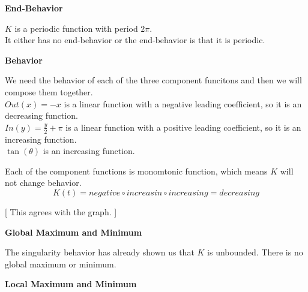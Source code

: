 \documentclass{ximera}
\begin{document}
\textbf{\textcolor{blue!55!black}{End-Behavior}}


$K$ is a periodic function with period $2\pi$. \\

It either has no end-behavior or the end-behavior is that it is periodic.











\textbf{\textcolor{blue!55!black}{Behavior}}


We need the behavior of each of the three component funcitons and then we will compose them together. \\




$Out(x) = -x$ is a linear function with a negative leading coefficient, so it is an decreasing function.\\


$In(y) = \frac{y}{2} + \pi$ is a linear function with a positive leading coefficient, so it is an increasing function.\\


$\tan(\theta)$ is an increasing function.


Each of the component functions is monomtonic function, which means $K$ will not change behavior. \\



\[
K(t) = negative \circ increasin \circ increasing = decreasing
\]




[ This agrees with the graph. ]












\textbf{\textcolor{blue!55!black}{Global Maximum and Minimum}}


The singularity behavior has already shown us that $K$ is unbounded. There is no global maximum or minimum.  














\textbf{\textcolor{blue!55!black}{Local Maximum and Minimum}}
\end{document}

